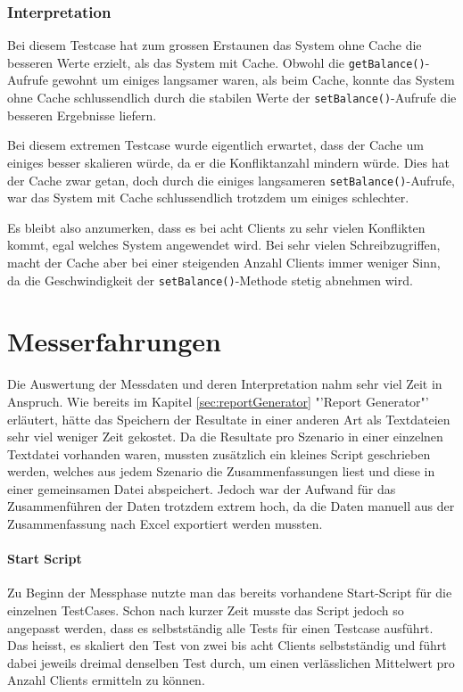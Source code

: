 \subsubsection{Interpretation}

Bei diesem Testcase hat zum grossen Erstaunen das System ohne Cache die besseren Werte erzielt, als das System mit Cache. Obwohl die \texttt{getBalance()}-Aufrufe gewohnt um einiges langsamer waren, als beim Cache, konnte das System ohne Cache schlussendlich durch die stabilen Werte der \texttt{setBalance()}-Aufrufe die besseren Ergebnisse liefern.

Bei diesem extremen Testcase wurde eigentlich erwartet, dass der Cache um einiges besser skalieren würde, da er die Konfliktanzahl mindern würde. Dies hat der Cache zwar getan, doch durch die einiges lang\-sa\-mer\-en \texttt{set\-Balance()}-Auf\-ru\-fe, war das System mit Cache schlus\-send\-lich trotz\-dem um ei\-nig\-es sch\-lech\-ter. 

Es bleibt also anzumerken, dass es bei acht Clients zu sehr vielen Konflikten kommt, egal welches System angewendet wird. Bei sehr vielen Schreibzugriffen, macht der Cache aber bei einer steigenden Anzahl Clients immer weniger Sinn, da die Geschwindigkeit der  \texttt{setBalance()}-Methode stetig abnehmen wird.

\section{Messerfahrungen}
Die Auswertung der Messdaten und deren Interpretation nahm sehr viel Zeit in Anspruch. Wie bereits im Kapitel \ref{sec:reportGenerator} "'Report Generator"' erläutert, hätte das Speichern der Resultate in einer anderen Art als Textdateien sehr viel weniger Zeit gekostet. Da die Resultate pro Szenario in einer einzelnen Textdatei vorhanden waren, mussten zusätzlich ein kleines Script geschrieben werden, welches  aus jedem Szenario die Zusammenfassungen liest und diese in einer gemeinsamen Datei abspeichert. Jedoch war der Aufwand für das Zusammenführen der Daten trotzdem extrem hoch, da die Daten manuell aus der Zusammenfassung nach Excel exportiert werden mussten. 

\paragraph{Start Script}
Zu Beginn der Messphase nutzte man das bereits vorhandene Start-Script für die einzelnen TestCases. Schon nach kurzer Zeit musste das Script jedoch so angepasst werden, dass es selbstständig alle Tests für einen Testcase ausführt. Das heisst, es skaliert den Test von zwei bis acht Clients selbstständig und führt dabei jeweils dreimal denselben Test durch, um einen verlässlichen Mittelwert pro Anzahl Clients ermitteln zu können.

